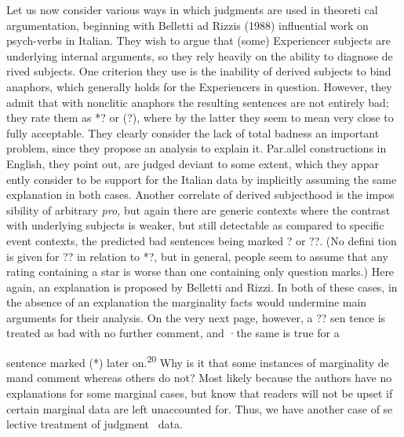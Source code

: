 \begin{styleStandard}
Let us now consider various ways in which judgments are used in theoreti\- cal argumentation, beginning with Belletti ad Rizzi{\textquotesingle}s (1988) influential work on psych-verbs in Italian. They wish to argue that (some) Experiencer subjects are underlying internal arguments, so they rely heavily on the ability to diagnose de\- rived subjects. One criterion they use is the inability of derived subjects to bind anaphors, which generally holds for the Experiencers in question. However, they admit that with nonclitic anaphors the resulting sentences are not entirely bad; they rate them as {\textquotedbl}*?{\textquotedbl} or {\textquotedbl}(?),{\textquotedbl} where by the latter they seem to mean {\textquotedbl}very close to fully acceptable.{\textquotedbl} They clearly consider the lack of total badness an important problem, since{\textquotesingle} they propose an analysis to explain it. Par.allel constructions in English, they point out, {\textquotedbl}are judged deviant to some extent,{\textquotedbl} which they appar\- ently consider to be support for the Italian data by implicitly assuming the same explanation in both cases. Another correlate of derived subjecthood is the impos\- sibility of arbitrary \textit{pro,}\textit{ }but again there are generic contexts where the contrast with underlying subjects is {\textquotedbl}weaker, but still detectable{\textquotedbl} as compared to specific event contexts, the predicted bad sentences being marked {\textquotedbl}?{\textquotedbl} or {\textquotedbl}??.{\textquotedbl} (No defini\- tion is given for {\textquotedbl}??{\textquotedbl} in relation to {\textquotedbl}*?,{\textquotedbl} but in general, people seem to assume that any rating containing a star is worse than one containing only question marks.) Here again, an explanation is proposed by Belletti and Rizzi. In both of these cases, in the absence of an explanation the marginality facts would undermine main arguments for their analysis. On the very next page, however, a {\textquotedbl}??{\textquotedbl} sen\- tence is treated as bad with no further comment, and ·the same is true for a
\end{styleStandard}


\clearpage\setcounter{page}{1}\begin{styleStandard}
sentence marked {\textquotedbl}(*){\textquotedbl} later on.\textsuperscript{20}\textsuperscript{ }Why is it that some instances of marginality de\- mand comment whereas others do not? Most likely because the authors have no explanations for some marginal cases, but know that readers will not be upset if certain marginal data are left unaccounted for. Thus, we have another case of se\- lective treatment of judgment \ data.
\end{styleStandard}


